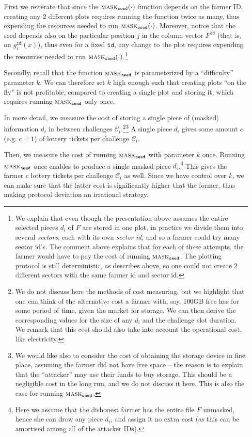 \documentclass[conference]{IEEEtran}
\newcommand{\id}{\texttt{id}}
\newcommand{\seed}{\texttt{seed}}
\newcommand{\mask}{\textsc{mask}}
\begin{document}
First we reiterate that since the $\mask_{\seed}(\cdot)$ function depends on the farmer ID, creating any $2$ different plots requires running the function twice as many, thus expending the resources needed to run $\mask_{\seed}(\cdot)$. Moreover, notice that the seed depends also on the particular position $j$ in the column vector $F^{\id}$ (that is, on $g_i^{\id}(x)$), thus even for a fixed $\id$, any change to the plot requires expending the resources needed to run $\mask_{\seed}(\cdot)$.\footnote{We explain that even though the presentation above assumes the entire selected pieces $d_i$ of $F$ are stored in one plot, in practice we divide them into several \emph{sectors}, each with its own \emph{sector id}, and so a farmer could try many sector id's. The comment above explains that for each of these attempts, the farmer would have to pay the cost of running $\mask_{\seed}$. The plotting protocol is still deterministic, as describes above, so one could not create $2$ different sectors with the same farmer id and sector id.}

Secondly, recall that the function $\mask_{\seed}$ is parameterized by a ``difficulty'' parameter $k$. We can therefore set $k$ high enough such that creating plots ``on the fly'' is not profitable, compared to creating a single plot and storing it, which requires running $\mask_{\seed}$ only once.

In more detail, we measure the cost of storing a single piece of (masked) information $d_i$ in between challenges $\mathcal{C}_t$.\footnote{We do not discuss here the methods of cost measuring, but we highlight that one can think of the alternative cost a farmer with, say, 100GB free has for some period of time, given the market for storage. We can then derive the corresponding values for the size of any $d_i$ and the challenge slot duration. We remark that this cost should also take into account the operational cost, like electricity.}\footnote{We would like also to consider the cost of obtaining the storage device in first place, assuming the farmer did not have free space -- the reason is to explain that the ``attacker'' may use their funds to buy storage. This should be a negligible cost in the long run, and we do not discuss it here. This is also the case for running $\mask_{\seed}$.} A single piece $d_i$ gives some amount $c$ (e.g. $c=1$) of lottery tickets per challenge $\mathcal{C}_t$.

Then, we measure the cost of running $\mask_{\seed}$ with parameter $k$ once. Running $\mask_{\seed}$ once enables to produce a single masked piece $d_i$.\footnote{Here we assume that the dishonest farmer has the entire file $F$ unmasked, hence she can draw any piece $d_i$, and assign it no extra cost (as this can be amortised among all of the attacker IDs).} This gives the farmer $c$ lottery tickets per challenge $\mathcal{C}_t$ as well. Since we have control over $k$, we can make sure that the latter cost is significantly higher that the former, thus making protocol deviation an irrational strategy.
\end{document}
